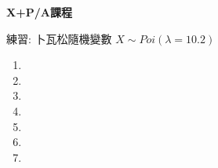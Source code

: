 \documentclass[a4 paper, 12pt]{report}
\begin{document}
\begin{center}
    \large \textbf{X+P/A課程}
\end{center}
    
練習: 卜瓦松隨機變數 $X \sim Poi(\lambda = 10.2)$

\begin{enumerate}
    
    \item 
    
    \item 
    
    \item 
    
    \item 
    
    \item 

    \item 

    \item 
    
\end{enumerate}
\end{document}
